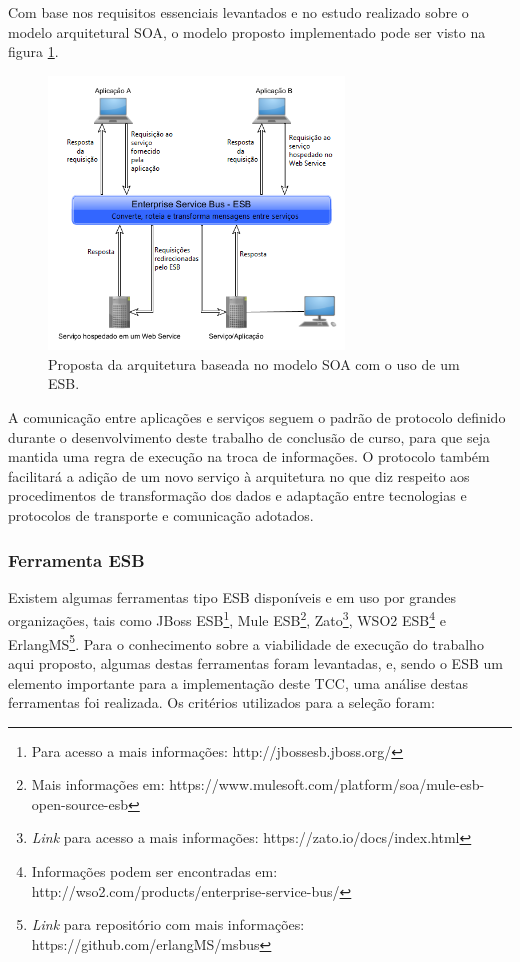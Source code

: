 Com base nos requisitos essenciais levantados e no estudo realizado sobre o modelo arquitetural SOA, o modelo proposto implementado pode ser visto na figura \ref{uso_esb}.

\begin{figure}[!hbt]
\centering
\includegraphics[width=0.7\textwidth]{figuras/uso_esb.png}
\caption{Proposta da arquitetura baseada no modelo SOA com o uso de um ESB.}
\label{uso_esb}
\end{figure}

A comunicação entre aplicações e serviços seguem o padrão de protocolo definido durante o desenvolvimento deste trabalho de conclusão de curso, para que seja mantida uma regra de execução na troca de informações. O protocolo também facilitará a adição de um novo serviço à arquitetura no que diz respeito aos procedimentos de transformação dos dados e adaptação entre tecnologias e protocolos de transporte e comunicação adotados.

\subsubsection{Ferramenta ESB}
Existem algumas ferramentas tipo ESB disponíveis e em uso por grandes organizações, tais como JBoss ESB\footnote{Para acesso a mais informações: http://jbossesb.jboss.org/}, Mule ESB\footnote{Mais informações em: https://www.mulesoft.com/platform/soa/mule-esb-open-source-esb}, Zato\footnote{\textit{Link} para acesso a mais informações: https://zato.io/docs/index.html}, WSO2 ESB\footnote{Informações podem ser encontradas em: http://wso2.com/products/enterprise-service-bus/} e ErlangMS\footnote{\textit{Link} para repositório com mais informações: https://github.com/erlangMS/msbus}. Para o conhecimento sobre a viabilidade de execução do trabalho aqui proposto, algumas destas ferramentas foram levantadas, e, sendo o ESB um elemento importante para a implementação deste TCC, uma análise destas ferramentas foi realizada. Os critérios utilizados para a seleção foram:

